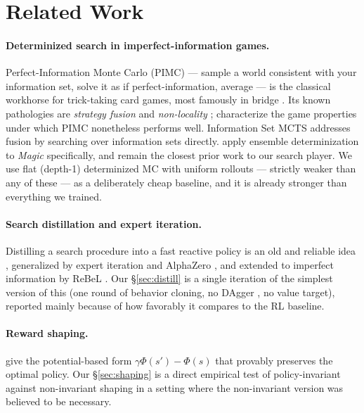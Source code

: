 \documentclass[11pt]{article}
\begin{document}
\section{Related Work}

\paragraph{Determinized search in imperfect-information games.} Perfect-Information Monte Carlo (PIMC) --- sample a world consistent with your information set, solve it as if perfect-information, average --- is the classical workhorse for trick-taking card games, most famously in bridge \citep{ginsberg2001gib}. Its known pathologies are \emph{strategy fusion} and \emph{non-locality} \citep{frank1998bridge}; \citet{long2010pimc} characterize the game properties under which PIMC nonetheless performs well. Information Set MCTS \citep{cowling2012ismcts} addresses fusion by searching over information sets directly. \citet{cowling2012magic} apply ensemble determinization to \textit{Magic} specifically, and remain the closest prior work to our search player. We use flat (depth-1) determinized MC with uniform rollouts --- strictly weaker than any of these --- as a deliberately cheap baseline, and it is already stronger than everything we trained.

\paragraph{Search distillation and expert iteration.} Distilling a search procedure into a fast reactive policy is an old and reliable idea \citep{guo2014uctdistill}, generalized by expert iteration \citep{anthony2017exit} and AlphaZero \citep{silver2018alphazero}, and extended to imperfect information by ReBeL \citep{brown2020rebel}. Our \S\ref{sec:distill} is a single iteration of the simplest version of this (one round of behavior cloning, no DAgger \citep{ross2011dagger}, no value target), reported mainly because of how favorably it compares to the RL baseline.

\paragraph{Reward shaping.} \citet{ng1999shaping} give the potential-based form $\gamma\Phi(s')-\Phi(s)$ that provably preserves the optimal policy. Our \S\ref{sec:shaping} is a direct empirical test of policy-invariant against non-invariant shaping in a setting where the non-invariant version was believed to be necessary.
\end{document}

